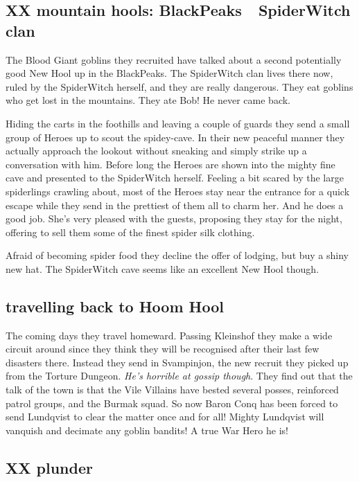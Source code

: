 \subsection*{XX mountain hools: BlackPeaks~\dash~SpiderWitch clan}

The Blood Giant goblins they recruited have talked about a second potentially good New Hool up in the BlackPeaks. The SpiderWitch clan lives there now, ruled by the SpiderWitch herself, and they are really dangerous. They eat goblins who get lost in the mountains. They ate Bob! He never came back.

Hiding the carts in the foothills and leaving a couple of guards they send a small group of Heroes up to scout the spidey-cave. In their new peaceful manner they actually approach the lookout without sneaking and simply strike up a conversation with him. Before long the Heroes are shown into the mighty fine cave and presented to the SpiderWitch herself. Feeling a bit scared by the large spiderlings crawling about, most of the Heroes stay near the entrance for a quick escape while they send in the prettiest of them all to charm her. And he does a good job. She's very pleased with the guests, proposing they stay for the night, offering to sell them some of the finest spider silk clothing.

Afraid of becoming spider food they decline the offer of lodging, but buy a shiny new hat. 
The SpiderWitch cave seems like an excellent New Hool though.


\subsection*{travelling back to Hoom Hool}

The coming days they travel homeward. Passing Kleinshof they make a wide circuit around since they think they will be recognised after their last few disasters there. Instead they send in Svampinjon, the new recruit they picked up from the Torture Dungeon. \emph{He's horrible at gossip though}. They find out that the talk of the town is that the Vile Villains have bested several posses, reinforced patrol groups, and the Burmak squad. So now Baron Conq has been forced to send Lundqvist to clear the matter once and for all! Mighty Lundqvist will vanquish and decimate any goblin bandits! A true War Hero he is!


\subsection*{XX plunder}

